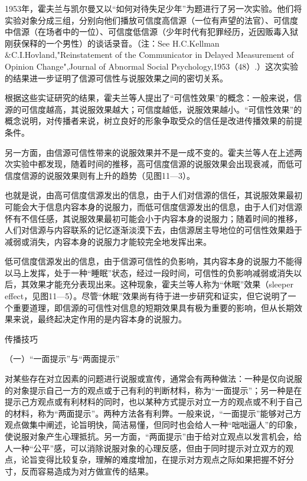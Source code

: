 \documentclass[UTF8,12pt]{ctexart}
\numberwithin{equation}{section} %
\numberwithin{figure}{section}
\numberwithin{table}{section}
\begin{document}
	1953年，霍夫兰与凯尔曼又以“如何对待失足少年”为题进行了另一次实验。他们将实验对象分成三组，分别向他们播放可信度高信源（一位有声望的法官）、可信度中信源（在场者中的一位）、可信度低信源（少年时代有犯罪经历，近因贩毒入狱刚获保释的一个男性）的谈话录音。（注：See H.C.Kellman \&C.I.Hovland,"Reinstatement of the Communicator in Delayed Measurement of Opinion Change",Journal of Abnormal Social Psychology,1953（48）.）这次实验的结果进一步证明了信源可信性与说服效果之间的密切关系。
	
	根据这些实证研究的结果，霍夫兰等人提出了“可信性效果”的概念：一般来说，信源的可信度越高，其说服效果越大；可信度越低，说服效果越小。“可信性效果”的概念说明，对传播者来说，树立良好的形象争取受众的信任是改进传播效果的前提条件。
	
	另一方面，由信源可信性带来的说服效果并不是一成不变的。霍夫兰等人在上述两次实验中都发现，随着时间的推移，高可信度信源的说服效果会出现衰减，而低可信度信源的说服效果则有上升的趋势（见图11—3）。
	
	也就是说，由高可信度信源发出的信息，由于人们对信源的信任，其说服效果最初可能会大于信息内容本身的说服力，而低可信度信源发出的信息，由于人们对信源怀有不信任感，其说服效果最初可能会小于内容本身的说服力；随着时间的推移，人们对信源与内容联系的记忆逐渐淡漠下去，由信源居主导地位的可信性效果趋于减弱或消失，内容本身的说服力才能较完全地发挥出来。
	
	低可信度信源发出的信息，由于信源可信性的负影响，其内容本身的说服力不能得以马上发挥，处于一种“睡眠”状态，经过一段时间，可信性的负影响减弱或消失以后，其效果才能充分表现出来。这种现象，霍夫兰等人称为“休眠”效果（sleeper effect，见图11—5）。尽管“休眠”效果尚有待于进一步研究和证实，但它说明了一个重要道理，即信源的可信性对信息的短期效果具有极为重要的影响，但从长期效果来说，最终起决定作用的是内容本身的说服力。
	
	传播技巧
	
	（一）“一面提示”与“两面提示”
	
	对某些存在对立因素的问题进行说服或宣传，通常会有两种做法：一种是仅向说服的对象提示自己一方的观点或于己有利的判断材料，称为“一面提示”；另一种是在提示己方观点或有利材料的同时，也以某种方式提示对立一方的观点或不利于自己的材料，称为“两面提示”。两种方法各有利弊。一般来说，“一面提示”能够对己方观点做集中阐述，论旨明快，简洁易懂，但同时也会给人一种“咄咄逼人”的印象，使说服对象产生心理抵抗。另一方面，“两面提示”由于给对立观点以发言机会，给人一种“公平”感，可以消除说服对象的心理反感，但由于同时提示对立双方的观点，论旨变得比较复杂，理解的难度增加，在提示对方观点之际如果把握不好分寸，反而容易造成为对方做宣传的结果。
	
\end{document}
